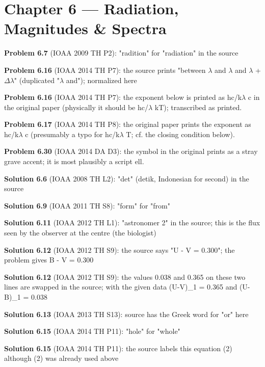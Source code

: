 \section*{Chapter 6 --- Radiation, Magnitudes \& Spectra}

\noindent\textbf{Problem 6.7} (IOAA 2009 TH P2): "radition" for "radiation" in the source
\smallskip

\noindent\textbf{Problem 6.16} (IOAA 2014 TH P7): the source prints "between $\lambda$ and $\lambda$ and $\lambda$ + $\Delta$$\lambda$" (duplicated "$\lambda$ and"); normalized here
\smallskip

\noindent\textbf{Problem 6.16} (IOAA 2014 TH P7): the exponent below is printed as hc/k$\lambda$ c in the original paper (physically it should be hc/$\lambda$ kT); transcribed as printed.
\smallskip

\noindent\textbf{Problem 6.17} (IOAA 2014 TH P8): the original paper prints the exponent as hc/k$\lambda$ c (presumably a typo for hc/k$\lambda$ T; cf. the closing condition below).
\smallskip

\noindent\textbf{Problem 6.30} (IOAA 2014 DA D3): the symbol in the original prints as a stray grave accent; it is most plausibly a script ell.
\smallskip

\noindent\textbf{Solution 6.6} (IOAA 2008 TH L2): "det" (detik, Indonesian for second) in the source
\smallskip

\noindent\textbf{Solution 6.9} (IOAA 2011 TH S8): "form" for "from"
\smallskip

\noindent\textbf{Solution 6.11} (IOAA 2012 TH L1): "astronomer 2" in the source; this is the flux seen by the observer at the centre (the biologist)
\smallskip

\noindent\textbf{Solution 6.12} (IOAA 2012 TH S9): the source says "U - V = 0.300"; the problem gives B - V = 0.300
\smallskip

\noindent\textbf{Solution 6.12} (IOAA 2012 TH S9): the values 0.038 and 0.365 on these two lines are swapped in the source; with the given data (U-V)\_1 = 0.365 and (U-B)\_1 = 0.038
\smallskip

\noindent\textbf{Solution 6.13} (IOAA 2013 TH S13): source has the Greek word for "or" here
\smallskip

\noindent\textbf{Solution 6.15} (IOAA 2014 TH P11): "hole" for "whole"
\smallskip

\noindent\textbf{Solution 6.15} (IOAA 2014 TH P11): the source labels this equation (2) although (2) was already used above
\smallskip

